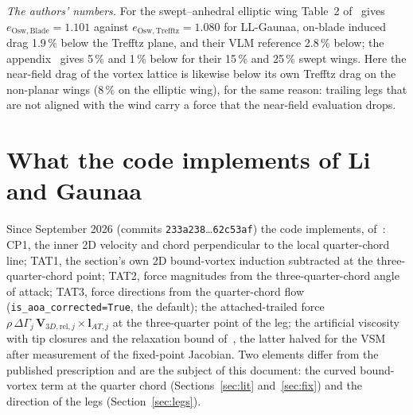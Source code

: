 \documentclass[11pt,a4paper]{article}
\begin{document}
\emph{The authors' numbers.} For the swept--anhedral elliptic wing Table~2 of~\cite{gaunaa2026} gives $e_{\mathrm{Osw,Blade}}=1.101$ against $e_{\mathrm{Osw,Trefftz}}=1.080$ for LL-Gaunaa, on-blade induced drag 1.9\,\% below the Trefftz plane, and their VLM reference 2.8\,\% below; the appendix~\cite{appendix2026} gives 5\,\% and 1\,\% below for their 15\,\% and 25\,\% swept wings. Here the near-field drag of the vortex lattice is likewise below its own Trefftz drag on the non-planar wings (8\,\% on the elliptic wing), for the same reason: trailing legs that are not aligned with the wind carry a force that the near-field evaluation drops.

\section{What the code implements of Li and Gaunaa}
\label{app:status}
Since September 2026 (commits \texttt{233a238}\ldots\texttt{62c53af}) the code implements, of~\cite{gaunaa2026,li2026}: CP1, the inner 2D velocity and chord perpendicular to the local quarter-chord line; TAT1, the section's own 2D bound-vortex induction subtracted at the three-quarter-chord point; TAT2, force magnitudes from the three-quarter-chord angle of attack; TAT3, force directions from the quarter-chord flow (\texttt{is\_aoa\_corrected=True}, the default); the attached-trailed force $\rho\,\Delta\Gamma_j\,\mathbf V_{3D,\mathrm{rel},j}\times\mathbf l_{AT,j}$ at the three-quarter point of the leg; the artificial viscosity with tip closures and the relaxation bound of~\cite{li2026}, the latter halved for the VSM after measurement of the fixed-point Jacobian. Two elements differ from the published prescription and are the subject of this document: the curved bound-vortex term at the quarter chord (Sections~\ref{sec:lit} and~\ref{sec:fix}) and the direction of the legs (Section~\ref{sec:legs}).
\end{document}
